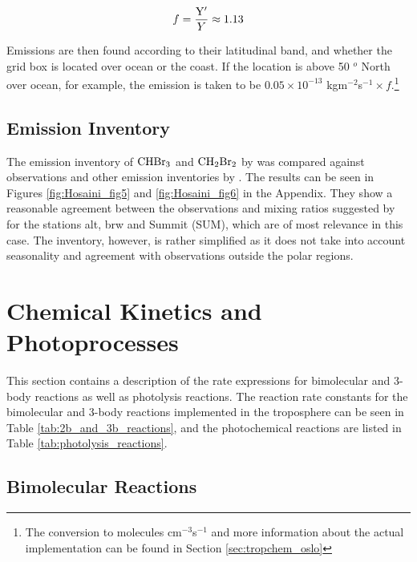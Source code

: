 \begin{equation*}
    f = \frac{\mathrm{Y'}}{Y} \approx 1.13
\end{equation*}


Emissions are then found according to their latitudinal band, and whether the grid box is located over ocean or the coast. If the location is above 50 $^o$ North over ocean, for example, the emission is taken to be $0.05\times10^{-13}$ kgm$^{-2}$s$^{-1}\times f$.\footnote{The conversion to molecules cm$^{-3}$s$^{-1}$ and more information about the actual implementation can be found in Section \ref{sec:tropchem_oslo}} 


\subsection{Emission Inventory}

The emission inventory of $\mathrm{CHBr_3}$ and $\mathrm{CH_2Br_2}$ by \cite{Liang2010} was compared against observations and other emission inventories by \cite{Hossaini2013}. The results can be seen in Figures \ref{fig:Hosaini_fig5} and \ref{fig:Hosaini_fig6} in the Appendix. They show a reasonable agreement between the observations and mixing ratios suggested by \cite{Liang2010} for the stations \acrfull{alt}, \acrfull{brw} and Summit (SUM), which are of most relevance in this case. The inventory, however, is rather simplified as it does not take into account seasonality and agreement with observations outside the polar regions. 



\section{Chemical Kinetics and Photoprocesses}\label{sec:chem_kinetics}

This section contains a description of the rate expressions for bimolecular and 3-body reactions as well as photolysis reactions. The reaction rate constants for the bimolecular and 3-body reactions implemented in the troposphere can be seen in Table \ref{tab:2b_and_3b_reactions}, and the photochemical reactions are listed in Table \ref{tab:photolysis_reactions}.






\subsection{Bimolecular Reactions}\label{sec:bimolecular_reactions}

